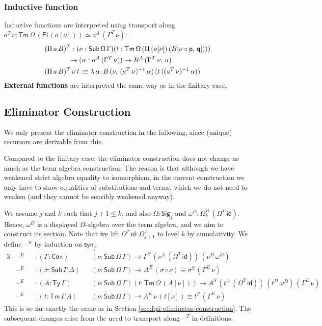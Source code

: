\documentclass[12pt,a4paper,twoside,openany]{book}
\theoremstyle{remark}
\theoremstyle{definition}
\theoremstyle{theorem}
\newcommand{\id}{\mathsf{id}}
\newcommand{\Con}{\mathsf{Con}}
\newcommand{\Sub}{\mathsf{Sub}}
\newcommand{\Tm}{\mathsf{Tm}}
\newcommand{\Ty}{\mathsf{Ty}}
\newcommand{\El}{\mathsf{El}}
\newcommand{\blank}{\mathord{\hspace{1pt}\text{--}\hspace{1pt}}}
\newcommand{\Pii}{\Pi}
\newcommand{\Sig}{\mathsf{Sig}}
\newcommand{\p}{\mathsf{p}}
\newcommand{\q}{\mathsf{q}}
\newcommand{\syn}{\mathsf{syn}}
\newcommand{\defn}{:\equiv}
\begin{document}
\subsubsection{Inductive function}
Inductive functions are interpreted using transport along $a^T\,\nu :
\Tm\,\Omega\,(\El\,(a[\nu])) \simeq a^A\,(\Gamma^T\,\nu)$:
\begin{alignat*}{3}
  &(\Pii\,a\,B)^T : (\nu : \Sub\,\Omega\,\Gamma)(t : \Tm\,\Omega\,(\Pii\,(a[\nu])\,(B[\nu\circ\p,\,\q])))\\
  & \hspace{3.5em}\to (\alpha : a^A\,(\Gamma^T\,\nu)) \to B^A\,(\Gamma^T\,\nu,\,\alpha)\\
  &(\Pii\,a\,B)^T\,\nu\,t \defn \lambda\,\alpha.\,
         B\,(\nu,\,(a^T\,\nu)^{-1}\,\alpha)\,(t\,((a^T\,\nu)^{-1}\,\alpha))
\end{alignat*}
\textbf{External functions} are interpreted the same way as in the finitary case.

\subsection{Eliminator Construction}

We only present the eliminator construction in the following, since (unique)
recursors are derivable from this.

Compared to the finitary case, the eliminator construction does not change as
much as the term algebra construction. The reason is that although we have
weakened strict algebra equality to isomorphism, in the current construction we
only have to show equalities of substitutions and terms, which we do not need to
weaken (and they cannot be sensibly weakened anyway).

We assume $j$ and $k$ such that $ j + 1 \leq k$, and also $\Omega : \Sig_j$ and
$\omega^D : \Omega^D_k\,(\Omega^T\,\id)$. Hence, $\omega^D$ is a displayed
$\Omega$-algebra over the term algebra, and we aim to construct its section.
Note that we lift $\Omega^T\,\id : \Omega^A_{j+1}$ to level $k$ by cumulativity.
We define $\blank^E$ by induction on $\syn_j$.
\begin{alignat*}{3}
  &\blank^E &&: (\Gamma : \Con)&&(\nu : \Sub\,\Omega\,\Gamma) \to \Gamma^S\,(\nu^A\,(\Omega^T\,\id))\,(\nu^D\,\omega^D)\\
  &\blank^E &&: (\sigma : \Sub\,\Gamma\,\Delta)&&(\nu : \Sub\,\Omega\,\Gamma) \to \Delta^E\,(\sigma \circ \nu) \equiv \sigma^S\,(\Gamma^E\,\nu)\\
  &\blank^E &&: (A : \Ty\,\Gamma)&&(\nu : \Sub\,\Omega\,\Gamma)(t : \Tm\,\Omega\,(A[\nu]))
     \to A^S\,(t^A\,(\Omega^T\,\id))\,(t^D\,\omega^D)\,(\Gamma^E\,\nu)\\
  &\blank^E &&: (t : \Tm\,\Gamma\,A)&&(\nu : \Sub\,\Omega\,\Gamma) \to A^E\,\nu\,(t[\nu]) \equiv t^S\,(\Gamma^E\,\nu)
\end{alignat*}
This is so far exactly the same as in Section
\ref{sec:fqii-eliminator-construction}. The subsequent changes arise from
the need to transport along $\blank^T$ in definitions.
\end{document}
